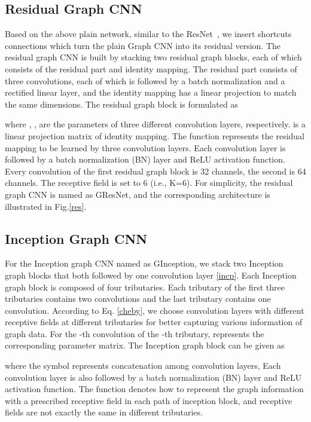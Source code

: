 \documentclass[journal]{IEEEtran}
\begin{document}
\subsection{Residual Graph CNN }
Based on the above plain network, similar to the ResNet~\cite{resnet}, we insert shortcuts connections which turn the plain Graph CNN into its residual version.
The residual graph CNN is built by stacking two residual graph blocks, each of which consists of the residual part and identity mapping.
The residual part consists of three convolutions, each of which is followed by a batch normalization and a rectified linear layer, and the identity mapping has a linear projection to match the same dimensions.
The residual graph block is formulated as

where , ,  are the parameters of three different convolution layers, respectively.  is a linear projection matrix of identity mapping. The function  represents the residual mapping to be learned by three convolution layers. Each convolution layer is followed by a batch normalization (BN) layer and ReLU activation function.
Every convolution of the first residual graph block is 32 channels, the second is 64 channels. The receptive field is set to 6 (i.e., K=6). For simplicity, the residual graph CNN is named as G\underline{\hspace{0.5em}}ResNet, and the corresponding architecture is illustrated in Fig.\ref{res}.




\subsection{Inception Graph CNN}
For the Inception graph CNN named as G\underline{\hspace{0.5em}}Inception, we stack two Inception graph blocks that both followed by one convolution layer \ref{incp}.
Each Inception graph block is composed of four tributaries. Each tributary of the first three tributaries contains two convolutions and the last tributary contains one convolution.
According to Eq. \ref{cheby}, we choose convolution layers with different receptive fields at different tributaries for better capturing various information of graph data.
For the -th convolution of the -th tributary,  represents the corresponding parameter matrix. The Inception graph block can be given as

where the symbol  represents concatenation \cite{mix} among convolution layers,
Each convolution layer is also followed by a batch normalization (BN) layer and ReLU activation function.
The function  denotes how to represent the graph information with a prescribed receptive field in each path of inception block, and receptive fields are not exactly the same in different tributaries.
\end{document}
